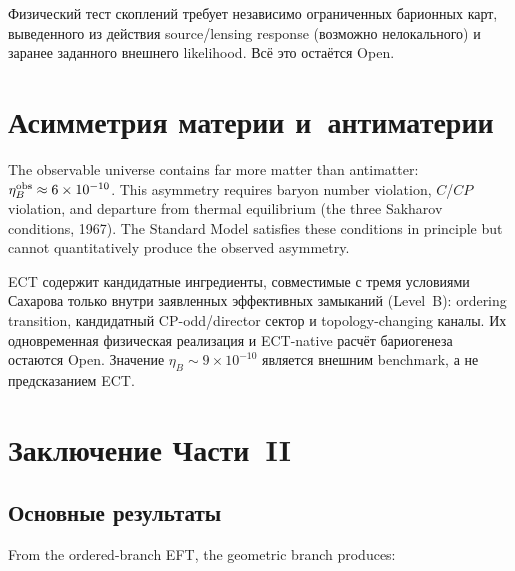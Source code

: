 \documentclass[11pt,a4paper]{article}
\begin{document}
Физический тест скоплений требует независимо ограниченных барионных карт,
выведенного из действия source/lensing response (возможно нелокального) и
заранее заданного внешнего likelihood. Всё это остаётся Open.

\section{Асимметрия материи и~антиматерии}

The observable universe contains far more matter than antimatter: $\eta_B^{\rm obs} \approx 6 \times 10^{-10}$. This asymmetry requires baryon number violation, $C$/$CP$ violation, and departure from thermal equilibrium (the three Sakharov conditions, 1967). The Standard Model satisfies these conditions in principle but cannot quantitatively produce the observed asymmetry.

ECT содержит кандидатные ингредиенты, совместимые с тремя условиями Сахарова только внутри заявленных эффективных замыканий (Level~B): ordering transition, кандидатный CP-odd/director сектор и topology-changing каналы. Их одновременная физическая реализация и ECT-native расчёт бариогенеза остаются Open. Значение $\eta_B\sim9\times10^{-10}$ является внешним benchmark, а не предсказанием ECT.





\section{Заключение Части~II}

\subsection{Основные результаты}

From the ordered-branch EFT, the geometric branch produces:
\end{document}
